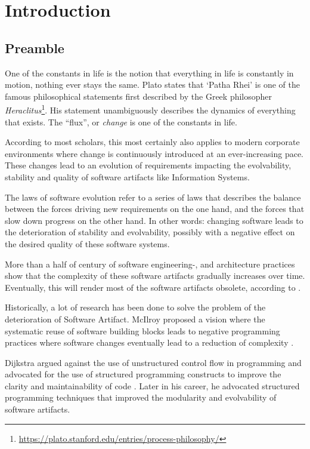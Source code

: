 \chapter{Introduction} \label{chap:introduction}

\section{Preamble} \label{sec:preamble}

One of the constants in life is the notion that everything in life is constantly in
motion, nothing ever stays the same. Plato states that \enquote*{Patha Rhei} is one of the
famous philosophical statements first described by the Greek philosopher
\emph{Heraclitus}\footnote{\url{https://plato.stanford.edu/entries/process-philosophy/}}.
His statement unambiguously describes the dynamics of everything that exists. The
\enquote{flux}, or \emph{change} is one of the constants in life. 

According to most scholars, this most certainly also applies to modern corporate
environments where change is continuously introduced at an ever-increasing pace. These
changes lead to an evolution of requirements impacting the evolvability, stability and
quality of software artifacts like Information Systems.

The laws of software evolution refer to a series of laws that describes the balance
between the forces driving new requirements on the one hand, and the forces that slow down
progress on the other hand. In other words: changing software leads to the deterioration of
stability and evolvability, possibly with a negative effect on the desired quality of
these software systems. \citeauthor*{lehman_programs_1980}

More than a half of century of software engineering-, and architecture practices show that
the complexity of these software artifacts gradually increases over time. Eventually, this
will render most of the software artifacts obsolete, according to
\citeauthor{lehman_programs_1980}.

Historically, a lot of research has been done to solve the problem of the deterioration of
Software Artifact. McIlroy proposed a vision where the systematic reuse of software
building blocks leads to negative programming practices where software changes eventually
lead to a reduction of complexity \parencite{p_naur_nato_1968}. 

Dijkstra argued against the use of unstructured control flow in programming and advocated
for the use of structured programming constructs to improve the clarity and
maintainability of code \parencite{dijkstra_letters_1968}. Later in his career, he
advocated structured programming techniques that improved the modularity and evolvability
of software artifacts.


